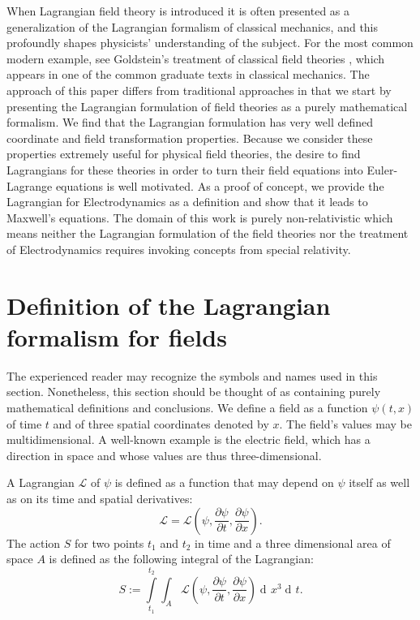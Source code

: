 \documentclass[prb,preprint]{revtex4-1}
\DeclareMathOperator{\dd}{d\!}
\begin{document}
When Lagrangian field theory is introduced it is often presented as a generalization of the Lagrangian formalism of classical mechanics, and this profoundly shapes physicists' understanding of the subject.
For the most common modern example, see Goldstein's treatment of classical field theories \cite{goldstein2002classical}, which appears in one of the common graduate texts in classical mechanics.
The approach of this paper differs from traditional approaches in that we start by presenting the Lagrangian formulation of field theories as a purely mathematical formalism.
We find that the Lagrangian formulation has very well defined coordinate and field transformation properties.
Because we consider these properties extremely useful for physical field theories, the desire to find Lagrangians for these theories in order to turn their field equations into Euler-Lagrange equations is well motivated.
As a proof of concept, we provide the Lagrangian for Electrodynamics as a definition and show that it leads to Maxwell's equations.
The domain of this work is purely non-relativistic which means neither the Lagrangian formulation of the field theories nor the treatment of Electrodynamics requires invoking concepts from special relativity. 

\section{Definition of the Lagrangian formalism for fields}\label{definition}

The experienced reader may recognize the symbols and names used in this section.
Nonetheless, this section should be thought of as containing purely mathematical definitions and conclusions.
We define a field as a function $\psi(t,x)$ of time $t$ and of three spatial coordinates denoted by $x$. 
The field's values may be multidimensional.
A well-known example is the electric field, which has a direction in space and whose values are thus three-dimensional.

A Lagrangian $\mathcal{L}$ of $\psi$ is defined as a function that may depend on $\psi$ itself as well as on its time and spatial derivatives: 
\begin{equation}
\mathcal{L} = \mathcal{L}\left(\psi, \frac{\partial \psi}{\partial t}, \frac{\partial \psi}{\partial x}\right).
\end{equation}
The action $S$ for two points $t_1$ and $t_2$ in time and a three dimensional area of space $A$ is defined as the following integral of the Lagrangian:
\begin{equation}
S := \int\limits_{t_1}^{t_2} \int_{A} \mathcal{L}\left(\psi, \frac{\partial \psi}{\partial t}, \frac{\partial \psi}{\partial x}\right) \dd x^3 \dd t.
\end{equation}
\end{document}
